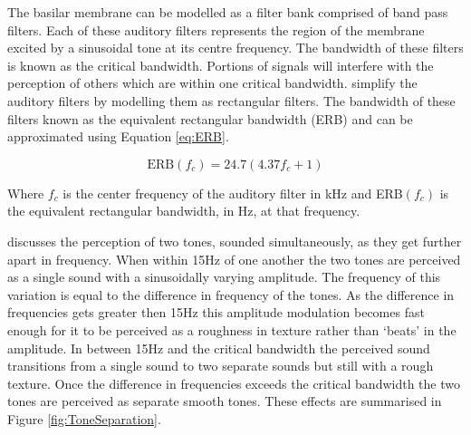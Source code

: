 		The basilar membrane can be modelled as a filter bank comprised of band pass filters. Each of these
		auditory filters represents the region of the membrane excited by a sinusoidal tone at its centre
		frequency. The bandwidth of these filters is known as the critical bandwidth. Portions of signals will
		interfere with the perception of others which are within one critical bandwidth.
		\citet{glasberg1990derivation} simplify the auditory filters by modelling them as rectangular filters. The
		bandwidth of these filters known as the equivalent rectangular bandwidth (ERB) and can be approximated using
		Equation \ref{eq:ERB}.

		\begin{equation}
			\textrm{ERB}(f_{c}) = 24.7(4.37f_{c} + 1)
			\label{eq:ERB}
		\end{equation}

		Where $f_{c}$ is the center frequency of the auditory filter in kHz and ERB$(f_{c})$ is the equivalent
		rectangular bandwidth, in Hz, at that frequency.

		\citet{howard2009acoustics} discusses the perception of two tones, sounded simultaneously, as they get
		further apart in frequency. When within 15Hz of one another the two tones are perceived as a single sound
		with a sinusoidally varying amplitude. The frequency of this variation is equal to the difference in
		frequency of the tones. As the difference in frequencies gets greater then 15Hz this amplitude modulation
		becomes fast enough for it to be perceived as a roughness in texture rather than `beats' in the amplitude.
		In between 15Hz and the critical bandwidth the perceived sound transitions from a single sound to two
		separate sounds but still with a rough texture. Once the difference in frequencies exceeds the critical
		bandwidth the two tones are perceived as separate smooth tones. These effects are summarised in Figure
		\ref{fig:ToneSeparation}.

